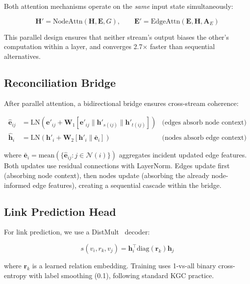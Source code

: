 \documentclass{article}
\begin{document}
Both attention mechanisms operate on the \emph{same} input state simultaneously:

\begin{equation}
    \mathbf{H}' = \text{NodeAttn}(\mathbf{H}, \mathbf{E}, G), \qquad \mathbf{E}' = \text{EdgeAttn}(\mathbf{E}, \mathbf{H}, \mathbf{A}_E)
\end{equation}

This parallel design ensures that neither stream's output biases the other's computation within a layer, and converges 2.7$\times$ faster than sequential alternatives.

\subsection{Reconciliation Bridge}
\label{sec:reconciliation}

After parallel attention, a bidirectional bridge ensures cross-stream coherence:

\begin{align}
    \hat{\mathbf{e}}_{ij} &= \text{LN}(\mathbf{e}'_{ij} + \mathbf{W}_1[\mathbf{e}'_{ij} \| \mathbf{h}'_{s(ij)} \| \mathbf{h}'_{t(ij)}]) & \text{(edges absorb node context)} \\
    \hat{\mathbf{h}}_i &= \text{LN}(\mathbf{h}'_i + \mathbf{W}_2[\mathbf{h}'_i \| \bar{\mathbf{e}}_i]) & \text{(nodes absorb edge context)}
\end{align}

where $\bar{\mathbf{e}}_i = \text{mean}(\{\hat{\mathbf{e}}_{ij} : j \in \mathcal{N}(i)\})$ aggregates incident updated edge features. Both updates use residual connections with LayerNorm. Edges update first (absorbing node context), then nodes update (absorbing the already node-informed edge features), creating a sequential cascade within the bridge.

\subsection{Link Prediction Head}

For link prediction, we use a DistMult~\cite{yang2015embedding} decoder:

\begin{equation}
    s(v_i, r_k, v_j) = \mathbf{h}_i^\top \text{diag}(\mathbf{r}_k) \mathbf{h}_j
\end{equation}

where $\mathbf{r}_k$ is a learned relation embedding. Training uses 1-vs-all binary cross-entropy with label smoothing (0.1), following standard KGC practice.
\end{document}
